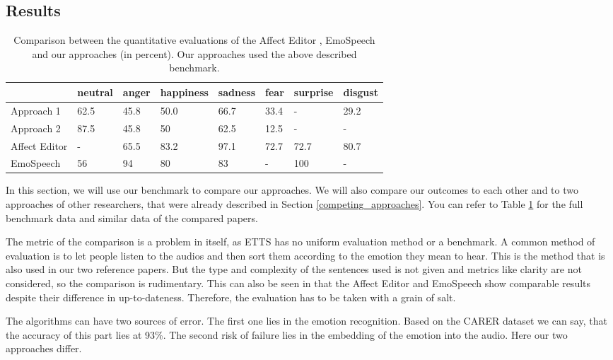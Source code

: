 \documentclass[11pt]{article}
\begin{document}
\subsection{Results}
\begin{table}[t]

\centering
\vspace{5px}
{
\begin{tabular}{|p{2cm}|p{1.5cm}|p{1.5cm}|p{1.5cm}|p{1.5cm}|p{1.5cm}|p{1.5cm}|p{1.5cm}|}
\hline
\rowcolor{mintgreen}&neutral&anger&happiness&sadness&fear&surprise&disgust\\
\hline
\cellcolor{gainsboro}Approach 1&62.5&45.8&50.0&66.7&33.4&-&29.2\\
\hline
\cellcolor{gainsboro}Approach 2&87.5&45.8&50&62.5&12.5&-&-\\
\hline
\hline
\cellcolor{gainsboro}Affect Editor& -&65.5&83.2&97.1&72.7&72.7&80.7\\
\hline
\cellcolor{gainsboro}EmoSpeech&56 &94&80 &83&-&100&-\\
\hline
\end{tabular}
}

\caption{Comparison between the quantitative evaluations of the Affect Editor \cite{cahn_generation_2000}, EmoSpeech \cite{diatlova_emospeech_2023} and our approaches (in percent). Our approaches used the above described benchmark.}
\label{Tabelle2}
\end{table}
In this section, we will use our benchmark to compare our approaches. We will also compare our outcomes to each other and to two approaches of other researchers, that were already described in Section \ref{competing_approaches}. You can refer to Table \ref{Tabelle2} for the full benchmark data and similar data of the compared papers.

The metric of the comparison is a problem in itself, as ETTS has no uniform evaluation method or a benchmark. A common method of evaluation is to let people listen to the audios and then sort them according to the emotion they mean to hear. This is the method that is also used in our two reference papers. But the type and complexity of the sentences used is not given and metrics like clarity are not considered, so the comparison is rudimentary. This can also be seen in that the Affect Editor \cite{cahn_generation_2000} and EmoSpeech \cite{diatlova_emospeech_2023} show comparable results despite their difference in up-to-dateness. Therefore, the evaluation has to be taken with a grain of salt.

The algorithms can have two sources of error. The first one lies in the emotion recognition. Based on the CARER dataset \cite{saravia-etal-2018-carer} we can say, that the accuracy of this part lies at 93\%. The second risk of failure lies in the embedding of the emotion into the audio. Here our two approaches differ.
\end{document}
